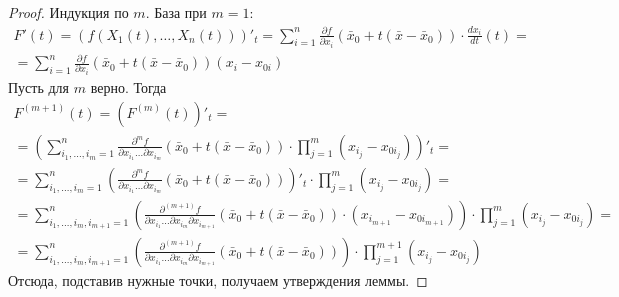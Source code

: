 \begin{proof}
    Индукция по $m$. База при $m=1$:
    \begin{multline*}
        F'(t)=(f(X_1(t),\dots,X_n(t)))'_t=\sum\limits_{i=1}^{n}\frac{\partial {f}}{\partial {x_i}}(\bar{x}_0+t(\bar{x}-\bar{x}_0))\cdot \frac{d {x_i}}{d {t}}(t)=\\
        =\sum\limits_{i=1}^{n}\frac{\partial {f}}{\partial {x_i}}(\bar{x}_0+t(\bar{x}-\bar{x}_0))(x_i-x_{0i})
    \end{multline*}
    Пусть для $m$ верно. Тогда 
    \begin{multline*}
        F^{(m+1)}(t)=(F^{(m)}(t))'_t=\\
        =\left(\sum\limits_{i_1,\dots,i_m=1}^{n} \frac{\partial^m {f}}{\partial {x_{i_1}}\dots \partial x_{i_m}}(\bar{x}_0+t(\bar{x}-\bar{x}_0))\cdot \prod\limits_{j=1}^{m}(x_{i_j}-x_{0i_j})\right)'_t=\\
        =\sum\limits_{i_1,\dots,i_m=1}^{n} \left(\frac{\partial^m {f}}{\partial {x_{i_1}}\dots \partial x_{i_m}}(\bar{x}_0+t(\bar{x}-\bar{x}_0))\right)'_t\cdot \prod\limits_{j=1}^{m}(x_{i_j}-x_{0i_j})=\\
        =\sum\limits_{i_1,\dots,i_m,i_{m+1}=1}^{n} \left(\frac{\partial^{(m+1)} {f}}{\partial {x_{i_1}}\dots \partial x_{i_m} \partial x_{i_{m+1}}}(\bar{x}_0+t(\bar{x}-\bar{x}_0))\cdot (x_{i_{m+1}}-x_{0i_{m+1}})\right)\cdot \prod\limits_{j=1}^{m}(x_{i_j}-x_{0i_j})=\\
    =\sum\limits_{i_1,\dots,i_m,i_{m+1}=1}^{n} \left(\frac{\partial^{(m+1)} {f}}{\partial {x_{i_1}}\dots \partial x_{i_m} \partial x_{i_{m+1}}}(\bar{x}_0+t(\bar{x}-\bar{x}_0))\right)\cdot \prod\limits_{j=1}^{m+1}(x_{i_j}-x_{0i_j})
    \end{multline*}
    Отсюда, подставив нужные точки, получаем утверждения леммы.
\end{proof} 